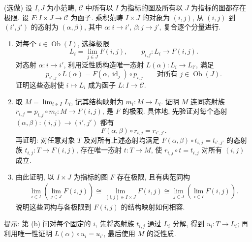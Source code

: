 \documentclass{article}
\begin{document}
\begin{problem}
({\heiti 选做}) 设 $I,J$ 为小范畴, $\mathcal C$ 中所有以 $I$ 为指标的图及所有以 $J$ 为指标的图都存在极限. 设 $F:I\times J\to\mathcal C$ 为函子. 乘积范畴 $I\times J$ 的对象为 $(i,j)$, 从 $(i,j)$ 到 $(i',j')$ 的态射为 $(\alpha,\beta)$, 其中 $\alpha:i\to i'$, $\beta:j\to j'$, 复合逐个分量进行.
\begin{enumerate}
  \item[(a)] 对每个 $i\in\operatorname{Ob}(I)$, 选择极限
  \[
    L_i=\lim_{j\in J}F(i,j),\qquad p_{i,j}:L_i\to F(i,j).
  \]
  对态射 $\alpha:i\to i'$, 利用泛性质构造唯一态射 $L(\alpha):L_i\to L_{i'}$, 满足
  \[
    p_{i',j}\circ L(\alpha)=F(\alpha,\operatorname{id}_j)\circ p_{i,j}\qquad\text{对所有 }j\in\operatorname{Ob}(J).
  \]
  证明这些态射使 $i\mapsto L_i$ 成为函子 $L:I\to\mathcal C$.
  \item[(b)] 取 $M=\lim_{i\in I}L_i$, 记其结构映射为 $m_i:M\to L_i$. 证明 $M$ 连同态射族 $r_{i,j}=p_{i,j}\circ m_i:M\to F(i,j)$, 是 $F$ 的极限. 具体地, 先验证对每个态射 $(\alpha,\beta):(i,j)\to(i',j')$ 都有
  \[
    F(\alpha,\beta)\circ r_{i,j}=r_{i',j'}.
  \]
  再证明: 对任意对象 $T$ 及对所有上述态射均满足 $F(\alpha,\beta)\circ t_{i,j}=t_{i',j'}$ 的态射族 $t_{i,j}:T\to F(i,j)$, 存在唯一态射 $t:T\to M$, 使 $r_{i,j}\circ t=t_{i,j}$ 对所有 $(i,j)$ 成立.
  \item[(c)] 由此证明, 以 $I\times J$ 为指标的图 $F$ 存在极限, 且有典范同构
  \begin{gather*}
    \lim_{i\in I}\left(\lim_{j\in J}F(i,j)\right)\cong\lim_{(i,j)\in I\times J}F(i,j) 
    \cong\lim_{j\in J}\left(\lim_{i\in I}F(i,j)\right).
  \end{gather*}
  说明这些同构与各极限到 $F(i,j)$ 的结构映射如何相容.
\end{enumerate}
提示: 第 (b) 问对每个固定的 $i$, 先将态射族 $t_{i,j}$ 通过 $L_i$ 分解, 得到 $u_i:T\to L_i$; 再利用唯一性证明 $L(\alpha)\circ u_i=u_{i'}$, 最后使用 $M$ 的泛性质.
\end{problem}
\end{document}
